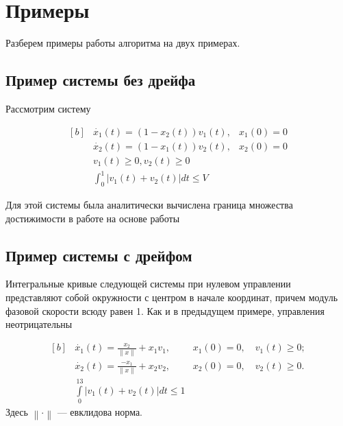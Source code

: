 \chapter{Примеры}
\label{ch:samples}

Разберем примеры работы алгоритма на двух примерах.
\section{Пример системы без дрейфа}
\label{sec:sample}

Рассмотрим систему 

\begin{equation*}
  \begin{aligned}[b]
    &\dot{x_1}(t) = (1 -x_2(t))v_1(t), & x_1(0)=0\\
    &\dot{x_2}(t) = (1-x_1(t))v_2(t), & x_2(0) = 0\\[8pt]
    &v_1(t) \ge 0, v_2(t) \ge 0 \\
    &\int_{0}^{1} |v_1(t) + v_2(t)| dt \le V
  \end{aligned}
\end{equation*}

Для этой системы была аналитически вычислена граница множества достижимости в
работе на основе работы \cite{AVS2016}

\section{Пример системы с дрейфом}
\label{sec:sample}

Интегральные кривые следующей системы при нулевом управлении
представляют собой окружности с центром в начале координат, причем
модуль фазовой скорости всюду равен 1. Как и в предыдущем примере,
управления неотрицательны

\begin{equation*}
  \begin{aligned}[b]
    &\dot{x_1}(t) = \frac{x_2}{\left\|x\right\|} + x_1v_1, &x_1(0) =
    0,\quad v_1(t) \ge 0;\\
    &\dot{x_2}(t) = \frac{-x_1}{\left\|x\right\|} + x_2v_2, &x_2(0)
    = 0,\quad v_2(t) \ge 0.\\
    &\int\limits_0^{13} |v_1(t)+ v_2(t)| dt \le 1
  \end{aligned}
\end{equation*}
Здесь $\left\| \cdot \right\|$ --- евклидова норма.


